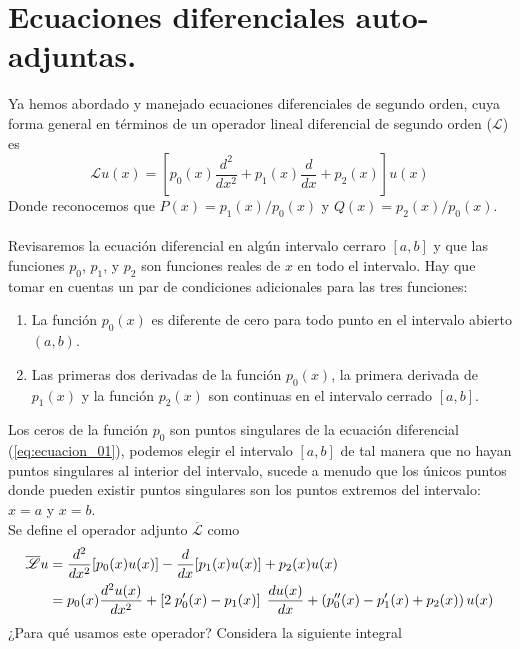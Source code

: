 \section{Ecuaciones diferenciales auto-adjuntas.}
Ya hemos abordado y manejado ecuaciones diferenciales de segundo orden, cuya forma general en términos de un operador lineal diferencial de segundo orden ($\mathscr{L}$) es
\begin{equation}
\mathscr{L} u(x) = \left[ p_{0}(x) \dfrac{d^{2}}{d x^{2}} + p_{1}(x) \dfrac{d}{dx} + p_{2}(x) \right]  u(x)
\label{eq:ecuacion_01}
\end{equation}
Donde reconocemos que $P(x) = p_{1}(x)/p_{0}(x)$ y $Q(x)= p_{2}(x)/p_{0}(x)$.
\\
\\
Revisaremos la ecuación diferencial en algún intervalo cerraro $[a,b]$ y que las funciones $p_{0}$, $p_{1}$, y $p_{2}$ son funciones reales de $x$ en todo el intervalo. Hay que tomar en cuentas un par de condiciones adicionales para las tres funciones:
\begin{enumerate}
\item La función $p_{0}(x)$ es diferente de cero para todo punto en el intervalo abierto $(a,b)$.
\item Las primeras dos derivadas de la función $p_{0}(x)$, la primera derivada de $p_{1}(x)$ y la función $p_{2}(x)$ son continuas en el intervalo cerrado $[a,b]$.
\end{enumerate}
Los ceros de la función $p_{0}$ son puntos singulares de la ecuación diferencial (\ref{eq:ecuacion_01}), podemos elegir el intervalo $[a,b]$ de tal manera que no hayan puntos singulares al interior del intervalo, sucede a menudo que los únicos puntos donde pueden existir puntos singulares son los puntos extremos del intervalo: $x = a$ y $x = b$.
\\
Se define el operador adjunto $\overline{\mathscr{L}}$ como
\begin{eqnarray}
\begin{aligned}
\overline{\mathscr{L}} u &= \dfrac{d^{2}}{d x^{2}}[ p_{0}(x) u(x)] - \dfrac{d}{dx} [p_{1}(x) u(x)] + p_{2}(x) u(x) \\
&= p_{0}(x)\dfrac{d^{2} u(x)}{d x^{2}} + \left[ 2 \; p^{\prime}_{0}(x) - p_{1}(x) \right] \; \dfrac{d u(x)}{dx} + \left( p^{\prime \prime}_{0}(x) - p^{\prime}_{1}(x) + p_{2}(x) \right) u(x)
\label{eq:ecuacion_02}
\end{aligned}
\end{eqnarray}
¿Para qué usamos este operador? Considera la siguiente integral
